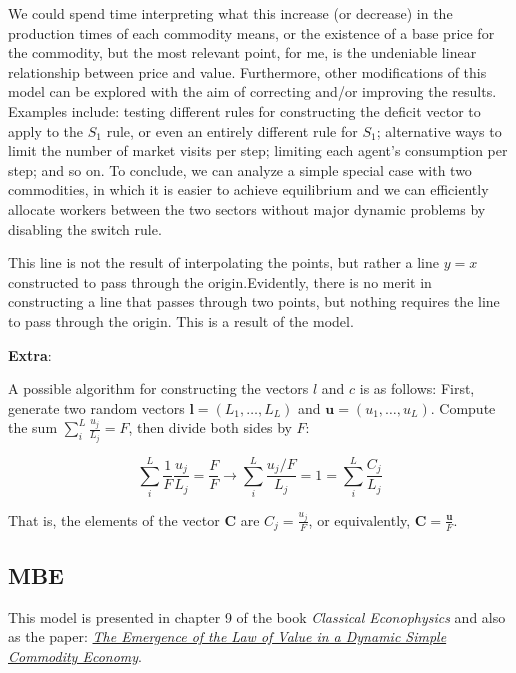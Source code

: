 We could spend time interpreting what this increase (or decrease) in the production times of each commodity means, or the existence of a base price for the commodity, but the most relevant point, for me, is the undeniable linear relationship between price and value.
Furthermore, other modifications of this model can be explored with the aim of correcting and/or improving the results. Examples include: testing different rules for constructing the deficit vector to apply to the $S_1$ rule, or even an entirely different rule for $S_1$; alternative ways to limit the number of market visits per step; limiting each agent’s consumption per step; and so on. To conclude, we can analyze a simple special case with two commodities, in which it is easier to achieve equilibrium and we can efficiently allocate workers between the two sectors without major dynamic problems by disabling the switch rule.

This line is not the result of interpolating the points, but rather a line $y=x$ constructed to pass through the origin.Evidently, there is no merit in constructing a line that passes through two points, but nothing requires the line to pass through the origin. This is a result of the model.


\textbf{Extra}:

A possible algorithm for constructing the vectors $l$ and $c$ is as follows:   First, generate two random vectors $\boldsymbol{l} = \left(L_{1}, \dots, L_{L}\right)$ and $\boldsymbol{u} = \left(u_{1}, \dots, u_{L}\right)$. Compute the sum $\sum_{i}^{L} \frac{u_{j}}{L_{j}} = F$, then divide both sides by $F$:


\begin{equation}
\sum_{i}^{L}\frac{1}{F}\frac{u_{j}}{L_{j}}=\frac{F}{F}\rightarrow\sum_{i}^{L}\frac{u_{j}/F}{L_{j}}=1=\sum_{i}^{L}\frac{C_{j}}{L_{j}}
\end{equation}

That is, the elements of the vector $\boldsymbol{C}$ are $C_{j} = \frac{u_{j}}{F}$, or equivalently, $\boldsymbol{C} = \frac{\boldsymbol{u}}{F}$.
\subsection{MBE}


This model is presented in chapter 9 of the book \textit{Classical Econophysics} and also as the paper: \href{https://doi.org/10.1080/09538250701661889}{\textit{The Emergence of the Law of Value in a Dynamic Simple Commodity Economy}}.

